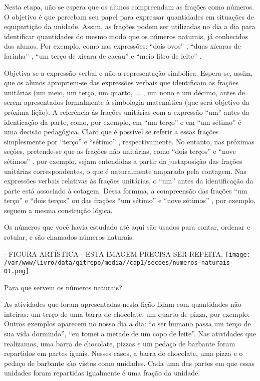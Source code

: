 \documentclass[a4paper,12pt,twoside]{book}
\begin{document}
\begin{professor*}[breakable]{}{}     
  
  Nesta etapa, não se espera que os alunos compreendam as frações como números. O objetivo é que percebam seu papel para expressar quantidades em situações de equipartição da unidade. Assim, as frações podem ser utilizadas no dia a dia para identificar quantidades do mesmo modo que os números naturais, já conhecidos dos alunos. Por exemplo, como nas expressões:   ``dois ovos''  ,   ``duas xícaras de farinha''  ,   ``um terço de xícara de cacau''   e   ``meio litro de leite''  .  
  
  Objetiva-se a expressão verbal e não a representação simbólica. Espera-se, assim, que os alunos apropriem-se das expressões verbais que identificam as frações unitárias (um meio, um terço, um quarto, ... , um nono e um décimo, antes de serem apresentados formalmente à simbologia matemática (que será objetivo da próxima lição).  A referência às frações unitárias com a expressão   ``um''   antes da identicação da parte, como, por exemplo, em   ``um terço''   e em   ``um sétimo''   é uma decisão pedagógica. Claro que é possível se referir a essas frações  simplesmente por   ``terço''   e   ``sétimo''  , respectivamente. No entanto, nas próximas seções, pretende-se que as frações não unitárias, como   ``dois terços''   e   ``nove sétimos''  , por exemplo, sejam entendidas a partir da justaposição das frações unitárias correspondentes, o que é naturalmente amparado pela contagem. Nas expressões verbais relativas às frações unitárias, o   ``um''   antes da identificação da parte está associado à cotagem. Dessa formma, a compreensão das frações   ``um terço''   e   ``dois terços''   ou das frações   ``um sétimo''   e   ``nove sétimos''  , por exemplo, seguem a mesma construção lógica.    
  
\end{professor*}  


Os números que você havia estudado até aqui são usados para contar, ordenar e rotular, e são chamados números naturais.
\begin{imagem*}[breakable]{}{}   - FIGURA ARTÍSTICA - ESTA IMAGEM PRECISA SER REFEITA.  
    \texttt{[image: /var/www/livro/data/gitrepo/media//cap1/secoes/numeros-naturais-01.png]}  
\end{imagem*}

Para que servem os números naturais?

As atividades que foram apresentadas nesta lição lidam com quantidades não inteiras: um terço de uma barra de chocolate, um quarto de pizza, por exemplo. 
Outros exemplos aparecem no nosso dia a dia: ``o ser humano passa um terço de sua vida dormindo'', ``eu tomei a metade de um copo de leite''. 
Nas atividades que realizamos, uma barra de chocolate, pizzas e um pedaço de barbante foram repartidos em partes iguais. 
Nesses casos, a barra de chocolate, uma pizza e o pedaço de barbante são vistos como unidades. 
Cada uma das partes em que essas unidades foram repartidas igualmente é uma fração da unidade.
\end{document}
